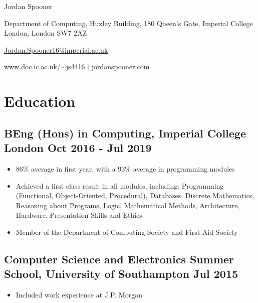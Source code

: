 \documentclass[a4paper, 8pt]{extarticle}
\begin{document}
\begin{center}
	{\huge\sffamily Jordan Spooner}
	
	\vspace{4pt}
	
	Department of Computing, Huxley Building, 180 Queen's Gate, Imperial College London, London SW7 2AZ
	
	\vspace{4pt}
	
	\href{mailto:Jordan.Spooner16@imperial.ac.uk}{\ttfamily Jordan.Spooner16@imperial.ac.uk}

	\href{https://www.doc.ic.ac.uk/~js4416}{\ttfamily www.doc.ic.ac.uk/$\sim$js4416} $\mid$ \href{https://jordanspooner.com}{\ttfamily jordanspooner.com}
\end{center}

\begin{minipage}[t]{.66\textwidth}

\section*{Education}

\subsection*{BEng (Hons) in Computing, Imperial College London \hfill Oct 2016 - Jul 2019}
\begin{itemize}
	\item 86\% average in first year, with a 93\% average in programming modules
	\item Achieved a first class result in all modules, including: Programming (Functional, Object-Oriented, Procedural), Databases, Discrete Mathematics, Reasoning about Programs, Logic, Mathematical Methods, Architecture, Hardware, Presentation Skills and Ethics
	\item Member of the Department of Computing Society and First Aid Society
\end{itemize}

\subsection*{Computer Science and Electronics Summer School, University of Southampton \hfill Jul 2015}
\begin{itemize}
	\item Included work experience at J.P. Morgan
\end{itemize}


\end{minipage}
\end{document}
